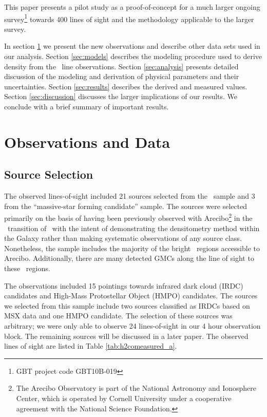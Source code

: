 This paper presents a pilot study as a proof-of-concept for a much larger
ongoing survey\footnote{GBT project code GBT10B-019} towards 400 lines of sight
and the methodology applicable to the larger survey.

In section \ref{sec:h2coobservations} we present the new observations and describe
other data sets used in our analysis.  Section \ref{sec:models} describes the
modeling procedure used to derive density from the \formaldehyde\ line
observations.  Section \ref{sec:analysis} presents detailed discussion of the
modeling and derivation of physical parameters and their uncertainties.
Section \ref{sec:results} describes the derived and measured values. 
Section \ref{sec:discussion} discusses the larger implications of our results.
We conclude with a brief summary of important results.

\section{Observations and Data}
\label{sec:h2coobservations}
\subsection{Source Selection} 
The observed lines-of-sight included 21 sources selected from the \citet{Araya2002} \uchii\
sample and 3 from the \citet{Araya2004} ``massive-star forming candidate''
sample.  The sources were selected primarily on the basis of having been
previously observed with Arecibo\footnote{The Arecibo Observatory is part of
the National Astronomy and Ionosphere Center, which is operated by Cornell
University under a cooperative agreement with the National Science Foundation.
} in the \oneone\ transition of \formaldehyde\
with the intent of demonstrating the densitometry method within the Galaxy
rather than making systematic observations of any source class.  Nonetheless,
the \citet{Araya2002} sample includes the majority of the bright \uchii\
regions accessible to Arecibo.  Additionally, there are many detected GMCs
along the line of sight to these \uchii\ regions.

The \citet{Araya2004} observations included 15 pointings towards infrared dark cloud
(IRDC) candidates and High-Mass Protostellar Object (HMPO) candidates.  The
sources we selected from this sample include two sources classified as IRDCs
based on MSX data and one HMPO candidate.  The selection of these sources was
arbitrary; we were only able to observe 24 lines-of-sight in our 4 hour
observation block.  The remaining sources will be discussed in a later paper.
The observed lines of sight are listed in Table \ref{tab:h2comeasured_a}.

